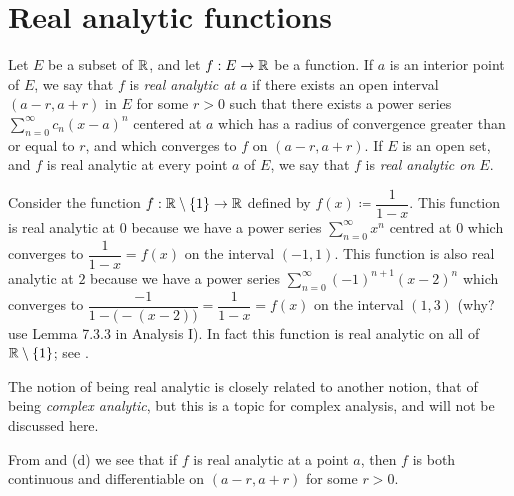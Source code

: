 \section{Real analytic functions}\label{ii:sec:4.2}

\begin{defn}\label{ii:4.2.1}
  Let \(E\) be a subset of \(\mathbb{R}\), and let \(f : E \to \mathbb{R}\) be a function.
  If \(a\) is an interior point of \(E\), we say that \(f\) is \emph{real analytic at \(a\)} if there exists an open interval \((a - r, a + r)\) in \(E\) for some \(r > 0\) such that there exists a power series \(\sum_{n = 0}^\infty c_n (x - a)^n\) centered at \(a\) which has a radius of convergence greater than or equal to \(r\), and which converges to \(f\) on \((a - r, a + r)\).
  If \(E\) is an open set, and \(f\) is real analytic at every point \(a\) of \(E\), we say that \(f\) is \emph{real analytic on \(E\)}.
\end{defn}

\begin{eg}\label{ii:4.2.2}
  Consider the function \(f : \mathbb{R} \setminus \left\lbrace1\right\rbrace \to \mathbb{R}\) defined by \(f(x) \coloneqq \dfrac{1}{1 - x}\).
  This function is real analytic at \(0\) because we have a power series \(\sum_{n = 0}^\infty x^n\) centred at \(0\) which converges to \(\dfrac{1}{1 - x} = f(x)\) on the interval \((-1, 1)\).
  This function is also real analytic at \(2\) because we have a power series \(\sum_{n = 0}^\infty (-1)^{n + 1} (x - 2)^n\) which converges to \(\dfrac{-1}{1 - \big(-(x - 2)\big)} = \dfrac{1}{1 - x} = f(x)\) on the interval \((1, 3)\)
  (why? use Lemma 7.3.3 in Analysis I).
  In fact this function is real analytic on all of \(\mathbb{R} \setminus \left\lbrace1\right\rbrace\);
  see .
\end{eg}

\begin{rmk}\label{ii:4.2.3}
  The notion of being real analytic is closely related to another notion, that of being \emph{complex analytic}, but this is a topic for complex analysis, and will not be discussed here.
\end{rmk}

\begin{note}
  From  and (d) we see that if \(f\) is real analytic at a point \(a\), then \(f\) is both continuous and diﬀerentiable on \((a - r, a + r)\) for some \(r > 0\).
\end{note}

